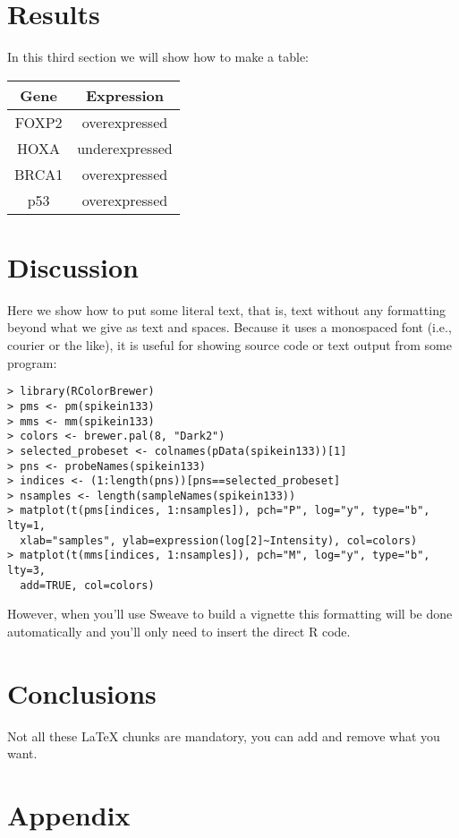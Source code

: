\documentclass{article}
\begin{document}
\section*{Results}

In this third section we will show how to make a table:

\begin{center}
\begin{tabular}{||c|c||} \hline
  {\bf Gene} & {\bf Expression} \\ \hline\hline
  FOXP2 & overexpressed \\ \hline
  HOXA & underexpressed \\ \hline
  BRCA1 & overexpressed \\ \hline
  p53 & overexpressed \\ \hline\hline
\end{tabular}
\end{center}

\section*{Discussion}

Here we show how to put some literal text, that is, text without any
formatting beyond what we give as text and spaces. Because it uses a
monospaced font (i.e., courier or the like), it is useful for showing
source code or text output from some program:

\begin{verbatim}
> library(RColorBrewer)
> pms <- pm(spikein133)
> mms <- mm(spikein133)
> colors <- brewer.pal(8, "Dark2")
> selected_probeset <- colnames(pData(spikein133))[1]
> pns <- probeNames(spikein133)
> indices <- (1:length(pns))[pns==selected_probeset]
> nsamples <- length(sampleNames(spikein133))
> matplot(t(pms[indices, 1:nsamples]), pch="P", log="y", type="b", lty=1,
  xlab="samples", ylab=expression(log[2]~Intensity), col=colors)
> matplot(t(mms[indices, 1:nsamples]), pch="M", log="y", type="b", lty=3,
  add=TRUE, col=colors)
\end{verbatim}

However, when you'll use Sweave to build a vignette this formatting will
be done automatically and you'll only need to insert the direct R code.

\section*{Conclusions}



Not all these LaTeX chunks are mandatory, you can add and remove what
you want.




\section*{Appendix} %
\end{document}
